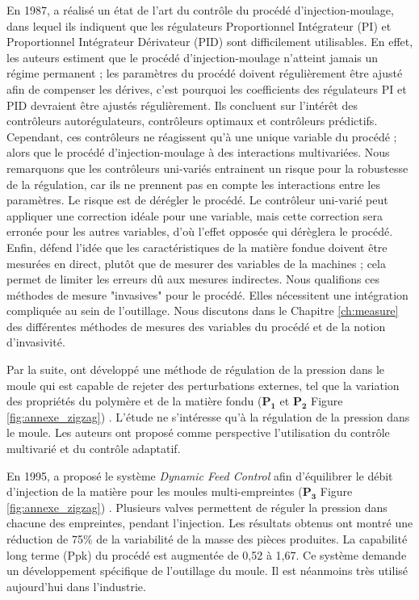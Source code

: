 En 1987, \citeauthor{agrawal_injection-molding_1987} \cite{agrawal_injection-molding_1987} a réalisé un état de l'art du contrôle du procédé d’injection-moulage, dans lequel ils indiquent que les régulateurs Proportionnel Intégrateur (PI) et Proportionnel Intégrateur Dérivateur (PID) sont difficilement utilisables.
En effet, les auteurs estiment que le procédé d'injection-moulage n'atteint jamais un régime permanent ; les paramètres du procédé doivent régulièrement être ajusté afin de compenser les dérives, c'est pourquoi les coefficients des régulateurs PI et PID devraient être ajustés régulièrement.
Ils concluent sur l’intérêt des contrôleurs autorégulateurs, contrôleurs optimaux et contrôleurs prédictifs.
Cependant, ces contrôleurs ne réagissent qu’à une unique variable du procédé ; alors que le procédé d'injection-moulage à des interactions multivariées.
Nous remarquons que les contrôleurs uni-variés entrainent un risque pour la robustesse de la régulation, car ils ne prennent pas en compte les interactions entre les paramètres.
Le risque est de dérégler le procédé.
Le contrôleur uni-varié peut appliquer une correction idéale pour une variable, mais cette correction sera erronée pour les autres variables, d'où l'effet opposée qui dérèglera le procédé.
Enfin, \citeauthor{agrawal_injection-molding_1987} défend l'idée que les caractéristiques de la matière fondue doivent être mesurées en direct, plutôt que de mesurer des variables de la machines ; cela permet de limiter les erreurs dû aux mesures indirectes.
Nous qualifions ces méthodes de mesure "invasives" pour le procédé.
Elles nécessitent une intégration compliquée au sein de l'outillage.
Nous discutons dans le Chapitre \ref{ch:measure} des différentes méthodes de mesures des variables du procédé et de la notion d'invasivité.

Par la suite, \citeauthor{fara_comprehensive_1990} ont développé une méthode de régulation de la pression dans le moule qui est capable de rejeter des perturbations externes, tel que la variation des propriétés du polymère et de la matière fondu ($\boldsymbol{P_1}$ et $\boldsymbol{P_2}$ Figure \ref{fig:annexe_zigzag}) \cite{fara_comprehensive_1990}.
L'étude ne s'intéresse qu'à la régulation de la pression dans le moule.
Les auteurs ont proposé comme perspective l'utilisation du contrôle multivarié et du contrôle adaptatif.

En 1995, \citeauthor{kazmer_dynamic_1995} a proposé le système \textit{Dynamic Feed Control} afin d'équilibrer le débit d'injection de la matière pour les moules multi-empreintes ($\boldsymbol{P_3}$ Figure \ref{fig:annexe_zigzag}) \cite{kazmer_dynamic_1995}.
Plusieurs valves permettent de réguler la pression dans chacune des empreintes, pendant l'injection.
Les résultats obtenus ont montré une réduction de 75\% de la variabilité de la masse des pièces produites.
La capabilité long terme (Ppk) du procédé est augmentée de 0,52 à 1,67.
Ce système demande un développement spécifique de l'outillage du moule.
Il est néanmoins très utilisé aujourd'hui dans l'industrie.

